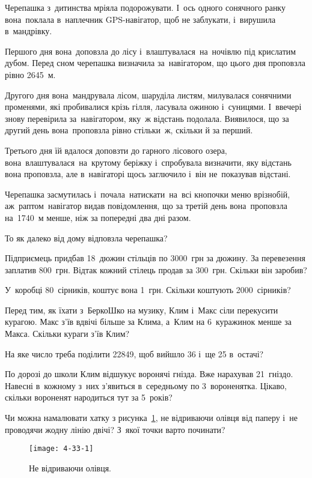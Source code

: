 \problem
Черепашка з~дитинства мріяла подорожувати. І~ось одного сонячного ранку
вона поклала в~наплечник GPS-навігатор, щоб не заблукати,
і~вирушила в~мандрівку.

Першого дня вона доповзла до лісу і~влаштувалася на ночівлю під крислатим
дубом. Перед сном черепашка визначила за навігатором, що цього дня
проповзла рівно 2645~м.

Другого дня вона мандрувала лісом, шаруділа листям, милувалася сонячними
променями, які пробивалися крізь гілля, ласувала ожиною і~суницями.
І~ввечері знову перевірила за навігатором, яку~ж відстань подолала.
Виявилося, що за другий день вона проповзла рівно стільки~ж,
скільки й за перший.

Третього дня їй вдалося доповзти до гарного лісового озера,
вона влаштувалася на крутому беріжку і~спробувала визначити,
яку відстань вона проповзла, але в~навігаторі щось заглючило
і~він не~показував відстані.

Черепашка засмутилась і~почала натискати на всі кнопочки меню врізнобій,
аж~раптом навігатор видав повідомлення, що за третій день вона проповзла
на 1740~м менше, ніж за попередні два дні разом.

То як далеко від дому відповзла черепашка?


\problem
Підприємець придбав 18~дюжин стільців по 3000~грн за дюжину.
За перевезення заплатив 800~грн.
Відтак кожний стілець продав за 300~грн.
Скільки він заробив?


\problem
У~коробці 80~сірників, коштує вона 1~грн.
Скільки коштують 2000~сірників?


\problem
Перед тим, як їхати з~БеркоШко на музику, Клим і~Макс сіли перекусити курагою.
Макс з’їв вдвічі більше за Клима, а~Клим на 6~куражинок менше за Макса.
Скільки кураги з’їв Клим?


\problem
На яке число треба поділити 22849, щоб вийшло 36 і~ще 25 в~остачі?


\problem
По дорозі до школи Клим відшукує воронячі гнізда. Вже нарахував 21~гніздо.
Навесні в~кожному з~них з’явиться в~середньому по 3~вороненятка.
Цікаво, скільки вороненят народиться тут за 5~років?


\problem
Чи можна намалювати хатку з рисунка~\ref{fig:one-line-figure},
не відриваючи олівця від паперу і~не проводячи жодну лінію двічі?
З~якої точки варто починати?

\begin{figure}[ht]
  \centering
  \texttt{[image: 4-33-1]}
  \caption{Не відриваючи олівця.}
  \label{fig:one-line-figure}
\end{figure}


